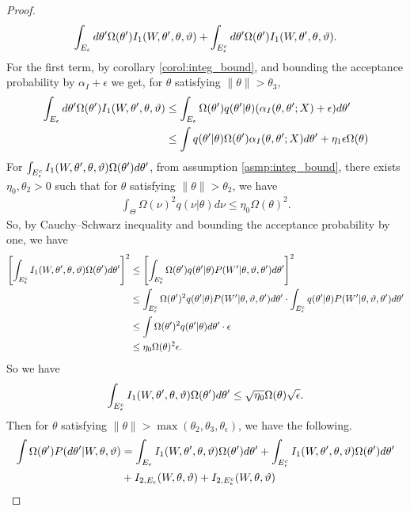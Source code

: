 \begin{proof}
$$\int_{E_\epsilon} d\theta' \Omega(\theta') I_1(W, \theta', \theta, \vartheta) +
\int_{E_\epsilon^c} d\theta' \Omega(\theta') I_1(W, \theta', \theta, \vartheta).
  $$
For the first term, by corollary \ref{corol:integ_bound}, and bounding
the acceptance probability by $\alpha_I + \epsilon$ we get, for $\theta$ satisfying $ \| \theta \| > \theta_3$,
\begin{align*}
\int_{E_\epsilon} d\theta' \Omega(\theta') I_1(W, \theta', \theta, \vartheta)  &
 \leq \int_{E_\epsilon} \Omega(\theta')q(\theta' | \theta) (\alpha_I(\theta, \theta'; X) + \epsilon) d\theta' \\
& \leq \int q(\theta' | \theta) \Omega(\theta')\alpha_I(\theta, \theta'; X) d\theta' + \eta_1 \epsilon \Omega(\theta)
\end{align*}
For $\int_{E_\epsilon^c} I_1(W, \theta', \theta, \vartheta) \Omega(\theta') d\theta'$, from assumption \ref{asmp:integ_bound}, there exists $\eta_0 , \theta_2 > 0$ such that for $\theta$ satisfying $ \| \theta \| > \theta_2$, we have
\begin{align*}
\int_\Theta \Omega(\nu)^2 q(\nu | \theta)d\nu \leq \eta_0 \Omega(\theta)^2.
\end{align*}
So, by Cauchy–Schwarz inequality and bounding the acceptance probability by one, we have
\begin{align*}
\left[  \int_{E_\epsilon^c} I_1(W, \theta', \theta, \vartheta) \Omega(\theta') d\theta' \right]^2
& \le \left[  \int_{E_\epsilon^c}  \Omega(\theta') q(\theta' | \theta) P(W' | \theta, \vartheta, \theta')d\theta' \right]^2\\
& \le \int_{E_\epsilon^c}  \Omega(\theta')^2 q(\theta' | \theta) P(W' | \theta, \vartheta, \theta')d\theta' \cdot \int_{E_\epsilon^c} q(\theta' | \theta) P(W' | \theta, \vartheta, \theta')d\theta' \\
& \le  \int  \Omega(\theta')^2 q(\theta' | \theta)d\theta' \cdot \epsilon \\
& \le  \eta_0 \Omega(\theta)^2 \epsilon.
\end{align*}
So we have
\begin{align*}
\int_{E_\epsilon^c} I_1(W, \theta', \theta, \vartheta) \Omega(\theta') d\theta' \le \sqrt{\eta_0}\Omega(\theta) \sqrt{\epsilon}.
\end{align*}
Then for $\theta$ satisfying $ \| \theta \| >\max(\theta_2, \theta_3, \theta_\epsilon)$, we have the following.
\begin{align*}
  \int \Omega(\theta') P(d\theta'| W, \theta, \vartheta)
  &= \int_{\E_\epsilon} I_1(W, \theta', \theta, \vartheta) \Omega(\theta') d\theta' + \int_{\E_\epsilon^c} I_1(W, \theta', \theta, \vartheta) \Omega(\theta') d\theta' \\ &+ I_{2,\E_{\epsilon}}(W, \theta, \vartheta) + I_{2,\E_{\epsilon}^c}(W, \theta, \vartheta) \\

\end{align*}
\end{proof}
